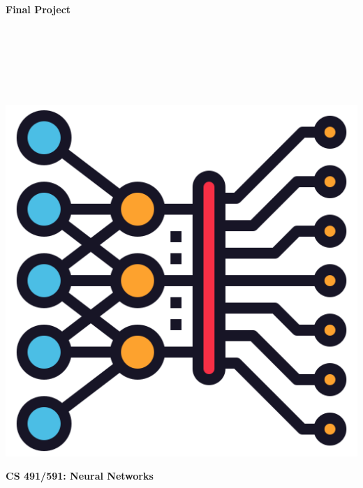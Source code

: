 \documentclass{article}
\begin{document}
\begin{titlepage}
\begin{center}
\vspace*{1cm}
            
\Huge
\textbf{Final Project}
            
\vspace{1cm}

\Large
{}

\vspace{2cm}

 \\
 \\
 \\
 \\
 \\

\vspace{2cm}

\includegraphics[scale=0.25]{figs/icon.png}\\[0.5cm]

\vspace{9cm}

\textbf{CS 491/591: Neural Networks} \\

\end{center}
\end{titlepage}
\end{document}
